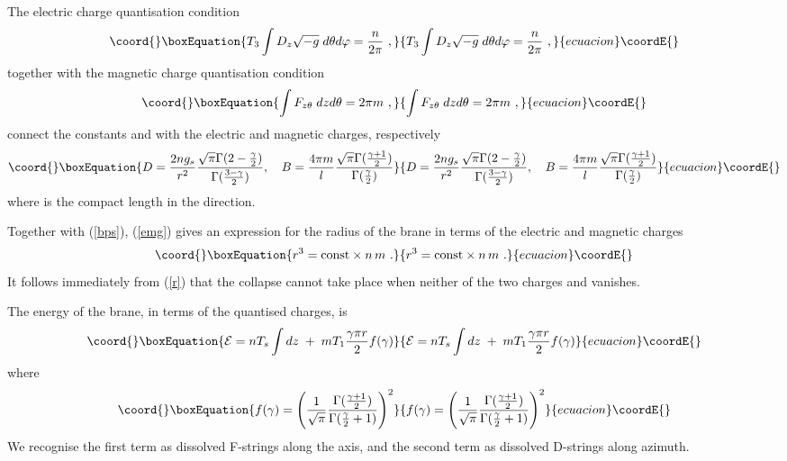 \documentclass[a4paper,12pt]{article}
\begin{document}
The electric charge quantisation condition
\begin{equation}\coord{}\boxEquation{
T_3\int D_z\sqrt{-g}\;d\theta d\varphi =\frac{n}{2\pi}\ ,
\label{ec}
}{
T_3\int D_z\sqrt{-g}\;d\theta d\varphi =\frac{n}{2\pi}\ ,
}{ecuacion}\coordE{}\end{equation}
together with the magnetic charge quantisation condition
\begin{equation}\coord{}\boxEquation{
\int F_{z\theta}\;dzd\theta =2\pi m\ ,
\label{mc}
}{
\int F_{z\theta}\;dzd\theta =2\pi m\ ,
}{ecuacion}\coordE{}\end{equation}
connect the constants \coordHE{} and \coordHE{} with the electric \coordHE{} and magnetic \coordHE{} charges, respectively
\begin{equation}\coord{}\boxEquation{
D=\frac{2ng_s}{r^2}
\frac{\sqrt{\pi}\Gamma (2-\frac{\gamma}{2})}
{\Gamma (\frac{3-\gamma}{2})},\quad 
B=\frac{4\pi m}{l}
\frac{\sqrt{\pi}\Gamma (\frac{\gamma +1}{2})}{\Gamma (\frac{\gamma}{2})}
\label{emg}
}{
D=\frac{2ng_s}{r^2}
\frac{\sqrt{\pi}\Gamma (2-\frac{\gamma}{2})}
{\Gamma (\frac{3-\gamma}{2})},\quad 
B=\frac{4\pi m}{l}
\frac{\sqrt{\pi}\Gamma (\frac{\gamma +1}{2})}{\Gamma (\frac{\gamma}{2})}
}{ecuacion}\coordE{}\end{equation}
where \coordHE{} is the compact length in the \coordHE{} direction.

Together with (\ref{bps}), (\ref{emg}) gives an expression for the radius \coordHE{} of the brane in terms of the electric and magnetic charges
\begin{equation}\coord{}\boxEquation{
r^3={\rm const}\times n\,m\ .
\label{r}
}{
r^3={\rm const}\times n\,m\ .
}{ecuacion}\coordE{}\end{equation}
It follows immediately from (\ref{r}) that the collapse \coordHE{} cannot take place when neither of the two charges \coordHE{} and \coordHE{} vanishes.

The energy of the brane, in terms of the quantised charges, is
\begin{equation}\coord{}\boxEquation{
{\cal E}=nT_s\int dz\; +\; mT_1\frac{\gamma\pi r}{2}f(\gamma )
\label{en}
}{
{\cal E}=nT_s\int dz\; +\; mT_1\frac{\gamma\pi r}{2}f(\gamma )
}{ecuacion}\coordE{}\end{equation}
where
\begin{equation}\coord{}\boxEquation{
f(\gamma )=\left(\frac{1}{\sqrt{\pi}}\frac{\Gamma (\frac{\gamma +1}{2})}
{\Gamma (\frac{\gamma}{2}+1)}\right)^2
\label{fac}
}{
f(\gamma )=\left(\frac{1}{\sqrt{\pi}}\frac{\Gamma (\frac{\gamma +1}{2})}
{\Gamma (\frac{\gamma}{2}+1)}\right)^2
}{ecuacion}\coordE{}\end{equation}
We recognise the first term as \coordHE{} dissolved F-strings along the \coordHE{} axis, and the second term as \coordHE{} dissolved D-strings along azimuth.
\end{document}
